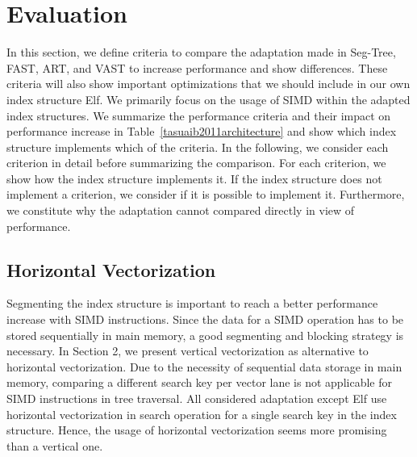 \documentclass[runningheads,a4paper]{llncs}
\begin{document}
\section{Evaluation}
In this section, we define criteria to compare the adaptation made in Seg-Tree, FAST, ART, and VAST to increase performance and show differences. These criteria will also show important optimizations that we should include in our own index structure Elf. We primarily focus on the usage of SIMD within the adapted index structures. %
We summarize the performance criteria and their impact on performance increase in Table~\ref{tasuaib2011architecture} and show which index structure implements which of the criteria. In the following, we consider each criterion in detail before summarizing the comparison. For each criterion, we show how the index structure implements it. If the index structure does not implement a criterion, we consider if it is possible to implement it. Furthermore, we constitute why the adaptation cannot compared directly in view of performance.

\subsection{Horizontal Vectorization}
Segmenting the index structure is important to reach a better performance increase with SIMD instructions. Since the data for a SIMD operation has to be stored sequentially in main memory, a good segmenting and blocking strategy is necessary. In Section 2, we present vertical vectorization as alternative to horizontal vectorization. Due to the necessity of sequential data storage in main memory, comparing a different search key per vector lane is not applicable for SIMD instructions in tree traversal. All considered adaptation except Elf use horizontal vectorization in search operation for a single search key in the index structure. Hence, the usage of horizontal vectorization seems more promising than a vertical one.

\end{document}
